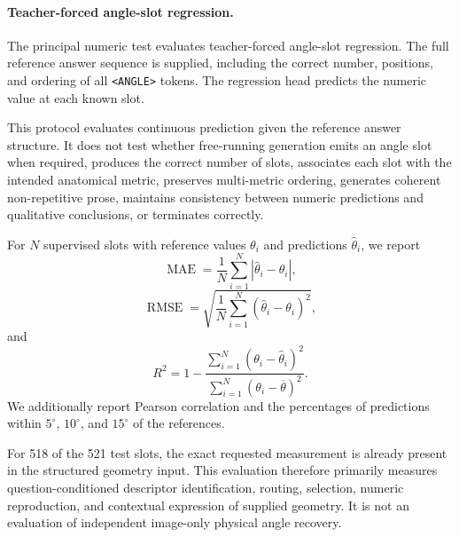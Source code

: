\paragraph{Teacher-forced angle-slot regression.}
The principal numeric test evaluates teacher-forced angle-slot
regression. The full reference answer sequence is supplied, including
the correct number, positions, and ordering of all
\texttt{<ANGLE>} tokens. The regression head predicts the numeric value
at each known slot.

This protocol evaluates continuous prediction given the reference
answer structure. It does not test whether free-running generation emits
an angle slot when required, produces the correct number of slots,
associates each slot with the intended anatomical metric, preserves
multi-metric ordering, generates coherent non-repetitive prose,
maintains consistency between numeric predictions and qualitative
conclusions, or terminates correctly.

For $N$ supervised slots with reference values $\theta_i$ and
predictions $\widehat{\theta}_i$, we report
\begin{equation}
    \operatorname{MAE}
    =
    \frac{1}{N}
    \sum_{i=1}^{N}
    \left|
        \widehat{\theta}_i-\theta_i
    \right|,
    \label{eq:evaluation_mae}
\end{equation}
\begin{equation}
    \operatorname{RMSE}
    =
    \sqrt{
        \frac{1}{N}
        \sum_{i=1}^{N}
        \left(
            \widehat{\theta}_i-\theta_i
        \right)^2
    },
    \label{eq:evaluation_rmse}
\end{equation}
and
\begin{equation}
    R^2
    =
    1-
    \frac{
        \sum_{i=1}^{N}
        \left(
            \theta_i-\widehat{\theta}_i
        \right)^2
    }{
        \sum_{i=1}^{N}
        \left(
            \theta_i-\overline{\theta}
        \right)^2
    }.
    \label{eq:evaluation_r2}
\end{equation}
We additionally report Pearson correlation and the percentages of
predictions within $5^\circ$, $10^\circ$, and $15^\circ$ of the
references.

For 518 of the 521 test slots, the exact requested measurement is
already present in the structured geometry input. This evaluation
therefore primarily measures question-conditioned descriptor
identification, routing, selection, numeric reproduction, and
contextual expression of supplied geometry. It is not an evaluation of
independent image-only physical angle recovery.

